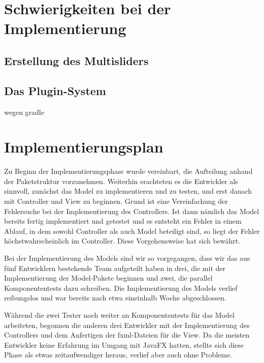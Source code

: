 \documentclass[parskip=full,11pt]{scrartcl}
\begin{document}
\section{Schwierigkeiten bei der Implementierung}

\subsection{Erstellung des Multisliders}

\subsection{Das Plugin-System}
wegen gradle

\section{Implementierungsplan}
Zu Beginn der Implementierungsphase wurde vereinbart, die Aufteilung anhand der Paketstruktur vorzunehmen. Weiterhin erachteten es die Entwickler als sinnvoll, zunächst das Model zu implementieren und zu testen, und erst danach mit Controller und View zu beginnen. Grund ist eine Vereinfachung der Fehlersuche bei der Implementierung des Controllers. Ist dann nämlich das Model bereits fertig implementiert und getestet und es entsteht ein Fehler in einem Ablauf, in dem sowohl Controller als auch Model beteiligt sind, so liegt der Fehler höchstwahrscheinlich im Controller. Diese Vorgehensweise hat sich bewährt.

Bei der Implementierung des Models sind wir so vorgegangen, dass wir das aus fünf Entwicklern bestehende Team aufgeteilt haben in drei, die mit der Implementierung der Model-Pakete beginnen und zwei, die parallel Komponententests dazu schreiben. Die Implementierung des Models verlief reibungslos und war bereits nach etwa eineinhalb Woche abgeschlossen.

Während die zwei Tester noch weiter an Komponententests für das Model arbeiteten, begonnen die anderen drei Entwickler mit der Implementierung des Controllers und dem Anfertigen der fxml-Dateien für die View. Da die meisten Entwickler keine Erfahrung im Umgang mit JavaFX hatten, stellte sich diese Phase als etwas zeitaufwendiger heraus, verlief aber auch ohne Probleme.
\end{document}
